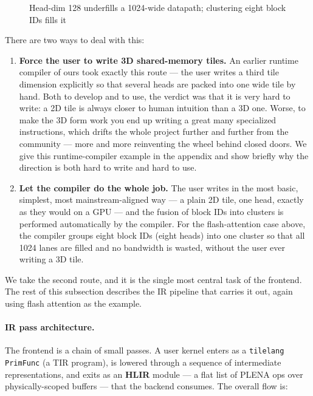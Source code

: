\documentclass[
  10pt,
]{article}
\begin{document}
\begin{figure}
\centering
\caption{Head-dim 128 underfills a 1024-wide datapath; clustering eight
block IDs fills it}
\end{figure}

There are two ways to deal with this:

\begin{enumerate}
\def\labelenumi{\arabic{enumi}.}
\item
  \textbf{Force the user to write 3D shared-memory tiles.} An earlier
  runtime compiler of ours took exactly this route --- the user writes a
  third tile dimension explicitly so that several heads are packed into
  one wide tile by hand. Both to develop and to use, the verdict was
  that it is very hard to write: a 2D tile is always closer to human
  intuition than a 3D one. Worse, to make the 3D form work you end up
  writing a great many specialized instructions, which drifts the whole
  project further and further from the community --- more and more
  reinventing the wheel behind closed doors. We give this
  runtime-compiler example in the appendix and show briefly why the
  direction is both hard to write and hard to use.
\item
  \textbf{Let the compiler do the whole job.} The user writes in the
  most basic, simplest, most mainstream-aligned way --- a plain 2D tile,
  one head, exactly as they would on a GPU --- and the fusion of block
  IDs into clusters is performed automatically by the compiler. For the
  flash-attention case above, the compiler groups eight block IDs (eight
  heads) into one cluster so that all 1024 lanes are filled and no
  bandwidth is wasted, without the user ever writing a 3D tile.
\end{enumerate}

We take the second route, and it is the single most central task of the
frontend. The rest of this subsection describes the IR pipeline that
carries it out, again using flash attention as the example.

\paragraph{IR pass architecture.}\label{frontend-ir-pass-architecture}

The frontend is a chain of small passes. A user kernel enters as a
\texttt{tilelang} \texttt{PrimFunc} (a TIR program), is lowered through a
sequence of intermediate representations, and exits as an
\textbf{HLIR} module --- a flat list of PLENA ops over physically-scoped
buffers --- that the backend consumes. The overall flow is:
\end{document}
